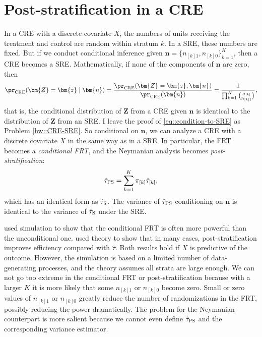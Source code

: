 




\section{Post-stratification in a CRE}\label{sec::poststra-cre}

In a CRE with a discrete covariate $X$, the numbers of units receiving the treatment and control are random within stratum $k$. In a SRE, these numbers are fixed. But if we conduct conditional inference given $\bm{n} = \{  n_{[k]1} , n_{[k]0} \}_{k=1}^K$, then a CRE becomes a SRE. Mathematically, if none of the components of $\bm{n}$ are zero, then 
\begin{equation}\label{eq::condition-to-SRE}
\pr_\textsc{CRE}(\bm{Z} = \bm{z} \mid\bm{n} )
= \frac{ \pr_\textsc{CRE}( \bm{Z} = \bm{z},  \bm{n})   }{ \pr_\textsc{CRE}(   \bm{n})   }
=  \frac{1}{  \prod_{k=1}^K  \binom{  n_{[k]} }{  n_{[k]1} } }  ,
\end{equation}
that is, the conditional distribution of $\bm{Z}$ from a CRE given $\bm{n}$ is identical to the distribution of $\bm{Z}$ from an SRE. 
I leave the proof of \eqref{eq::condition-to-SRE} as Problem \ref{hw::CRE-SRE}. 
So conditional on $\bm{n}$, we can analyze a CRE with a discrete covariate $X$ in the same way as in a SRE. 
In particular,  the FRT becomes a {\it conditional FRT}, and the Neymanian analysis becomes {\it post-stratification}:
$$
\hat{\tau}_\textsc{PS} = \sum_{k=1}^K \pi_{[k]} \hat{\tau}_{[k]},
$$
which has an identical form as $\hat{\tau}_\textsc{S}$. The variance of $\hat{\tau}_\textsc{PS} $ conditioning on $\bm{n}$ is identical to the variance of $\hat{\tau}_\textsc{S}$ under the SRE.  


\citet{hennessy2016conditional} used simulation to show that the conditional FRT is often more powerful than the unconditional one. \citet{miratrix:2013} used theory to show that in many cases, post-stratification improves efficiency compared with $\hat{\tau}$. Both results hold if $X$ is predictive of the outcome.  However, the simulation is based on a limited number of data-generating processes, and the theory assumes all strata are large enough. We can not go too extreme in the conditional FRT or post-stratification because with a larger $K$ it is more likely that some $n_{[k]1} $ or $ n_{[k]0}$ become zero. Small or zero values of $n_{[k]1} $ or $ n_{[k]0}$ greatly reduce the number of randomizations in the FRT, possibly reducing the power dramatically. The problem for the Neymanian counterpart is more salient because we cannot even define $\hat{\tau}_\textsc{PS}$ and the corresponding variance estimator. 


